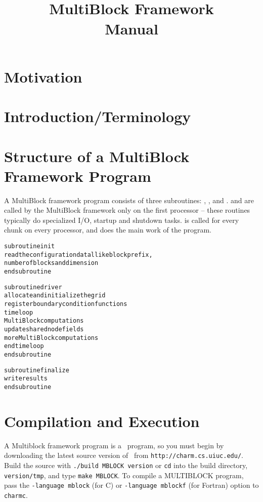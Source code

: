 \documentclass[10pt]{article}
\title{\charmpp\\ MultiBlock Framework\\ Manual}
\begin{document}
\maketitle

\section{Motivation}



\section{Introduction/Terminology}



\section{Structure of a MultiBlock Framework Program}

A MultiBlock framework program consists of three subroutines: , , and .   and  are called by the MultiBlock framework only on the first processor -- these routines typically do specialized I/O, startup and shutdown tasks.   is called for every chunk on every processor, and does the main work of the program.

\begin{alltt}
     subroutine init
          read the configuration data llike block prefix, 
	  number of blocks and dimension 
     end subroutine

     subroutine driver
	  allocate and initialize the grid
	  register boundary condition functions
          time loop
               MultiBlock computations
               update shared node fields
               more MultiBlock computations
          end time loop
     end subroutine

     subroutine finalize
           write results
     end subroutine
\end{alltt}

\section{Compilation and Execution}

A Multiblock framework program is a \charmpp\ program, so you must begin by
downloading the latest source version of \charmpp\ from
{\tt http://charm.cs.uiuc.edu/}.  Build the source with 
{\tt ./build MBLOCK version} or {\tt cd} into the build directory, 
{\tt version/tmp}, and type {\tt make MBLOCK}.
To compile a MULTIBLOCK program, pass the {\tt -language mblock} (for C) or 
{\tt -language mblockf} (for Fortran) option to {\tt charmc}.
\end{document}

